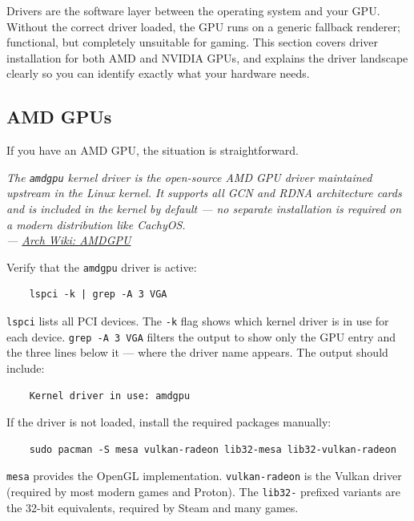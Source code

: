 \documentclass{article}
\newcommand{\code}[1]{\colorbox{codebg}{\texttt{#1}}}
\begin{document}
Drivers are the software layer between the operating system and your GPU. Without
the correct driver loaded, the GPU runs on a generic fallback renderer; functional, but completely unsuitable for gaming. This section covers driver
installation for both AMD and NVIDIA GPUs, and explains the driver landscape
clearly so you can identify exactly what your hardware needs.

\subsection{AMD GPUs}

If you have an AMD GPU, the situation is straightforward.

\begin{mdframed}[linewidth=1.5pt, linecolor=black!50, topline=true, bottomline=true,
	leftline=false, rightline=false, backgroundcolor=black!3]
	\small\itshape
	The \texttt{amdgpu} kernel driver is the open-source AMD GPU driver maintained
	upstream in the Linux kernel. It supports all GCN and RDNA architecture cards
	and is included in the kernel by default --- no separate installation is required
	on a modern distribution like CachyOS.\\[4pt]
	\normalfont\small ---
	\href{https://wiki.archlinux.org/title/AMDGPU}{Arch Wiki: AMDGPU}
\end{mdframed}

\noindent Verify that the \code{amdgpu} driver is active:

\begin{verbatim}
	lspci -k | grep -A 3 VGA
\end{verbatim}

\noindent \code{lspci} lists all PCI devices. The \code{-k} flag shows which kernel driver
is in use for each device. \code{grep -A 3 VGA} filters the output to show only
the GPU entry and the three lines below it --- where the driver name appears. The
output should include:

\begin{verbatim}
	Kernel driver in use: amdgpu
\end{verbatim}

\noindent If the driver is not loaded, install the required packages manually:

\begin{verbatim}
	sudo pacman -S mesa vulkan-radeon lib32-mesa lib32-vulkan-radeon
\end{verbatim}

\code{mesa} provides the OpenGL implementation. \code{vulkan-radeon} is the
Vulkan driver (required by most modern games and Proton). The \code{lib32-}
prefixed variants are the 32-bit equivalents, required by Steam and many games.
\end{document}
